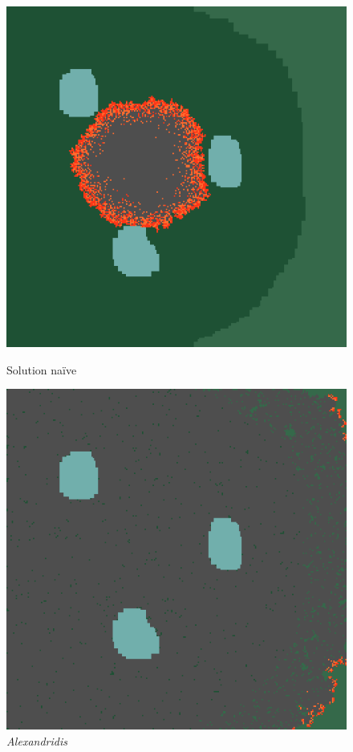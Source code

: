\documentclass[12pt]{article}
\begin{document}
\begin{figure}[!ht]
    \centering
    \begin{minipage}{0.35\textwidth}
      \centering
      \includegraphics[width=.8\linewidth]{pictures/model1/land_200.png}
      \caption{Solution naïve}\label{Fig:Data1}
    \end{minipage}
    \hfil
    \begin{minipage}{0.35\textwidth}
      \centering
      \includegraphics[width=.8\linewidth]{pictures/model2/land_200_nowind.png}
      \caption{\textit{Alexandridis}}\label{Fig:Data2}
    \end{minipage}
 \end{figure}
\end{document}

